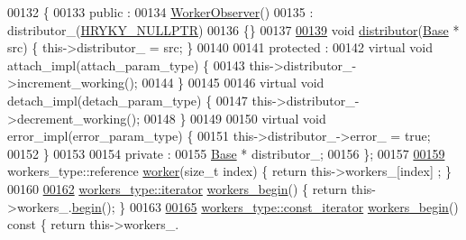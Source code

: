 \begin{DoxyCode}
00132     \{
00133     \textcolor{keyword}{public} :
00134         \hyperlink{classhryky_1_1task_1_1distributor_1_1_base_1_1_worker_observer}{WorkerObserver}()
00135             : distributor\_(\hyperlink{common_8h_a4cd4ac09cfcdbd6b30ee69afc156e210}{HRYKY_NULLPTR})
00136         \{\}
00137 
\hypertarget{task__distributor__base_8h_source_l00139}{}\hyperlink{classhryky_1_1task_1_1distributor_1_1_base_1_1_worker_observer_a54b231849b0ff42c96eaa37f5bc3d9de}{00139}         \textcolor{keywordtype}{void} \hyperlink{classhryky_1_1task_1_1distributor_1_1_base_1_1_worker_observer_a54b231849b0ff42c96eaa37f5bc3d9de}{distributor}(\hyperlink{classhryky_1_1task_1_1distributor_1_1_base}{Base} * src) \{ this->distributor\_ = src; \}
00140 
00141     \textcolor{keyword}{protected} :
00142         \textcolor{keyword}{virtual} \textcolor{keywordtype}{void} attach\_impl(attach\_param\_type) \{
00143             this->distributor\_->increment\_working();
00144         \}
00145 
00146         \textcolor{keyword}{virtual} \textcolor{keywordtype}{void} detach\_impl(detach\_param\_type) \{
00147             this->distributor\_->decrement\_working();
00148         \}
00149 
00150         \textcolor{keyword}{virtual} \textcolor{keywordtype}{void} error\_impl(error\_param\_type) \{
00151             this->distributor\_->error\_ = \textcolor{keyword}{true};
00152         \}
00153 
00154     \textcolor{keyword}{private} :
00155         \hyperlink{classhryky_1_1task_1_1distributor_1_1_base_a5ffe0568374d8b9b4c4ec32953fd6453}{Base} * distributor\_;
00156     \};
00157     
\hypertarget{task__distributor__base_8h_source_l00159}{}\hyperlink{classhryky_1_1task_1_1distributor_1_1_base_a69590e9a4cbe85a69eeb6d5477e994cd}{00159}     workers\_type::reference \hyperlink{classhryky_1_1task_1_1distributor_1_1_base_a69590e9a4cbe85a69eeb6d5477e994cd}{worker}(\textcolor{keywordtype}{size\_t} index) \{ \textcolor{keywordflow}{return} this->workers\_[index]
      ; \}
00160 
\hypertarget{task__distributor__base_8h_source_l00162}{}\hyperlink{classhryky_1_1task_1_1distributor_1_1_base_a22e3708e0f85225fb71fd408498711b8}{00162}     \hyperlink{classhryky_1_1iterator_1_1random_1_1_mutable}{workers_type::iterator} \hyperlink{classhryky_1_1task_1_1distributor_1_1_base_a22e3708e0f85225fb71fd408498711b8}{workers_begin}() \{ \textcolor{keywordflow}{return} this->workers\_.\hyperlink{classhryky_1_1_vector_aa032aa9e48dce836e68434e6ad58f0f5}{begin}(); \}
00163 
\hypertarget{task__distributor__base_8h_source_l00165}{}\hyperlink{classhryky_1_1task_1_1distributor_1_1_base_aabbf01ac8d82db60c55233d92c229ecb}{00165}     \hyperlink{classhryky_1_1iterator_1_1random_1_1_immutable}{workers_type::const_iterator} \hyperlink{classhryky_1_1task_1_1distributor_1_1_base_aabbf01ac8d82db60c55233d92c229ecb}{workers_begin}()\textcolor{keyword}{ const }\{ \textcolor{keywordflow}{return} this->workers\_.

\end{DoxyCode}
